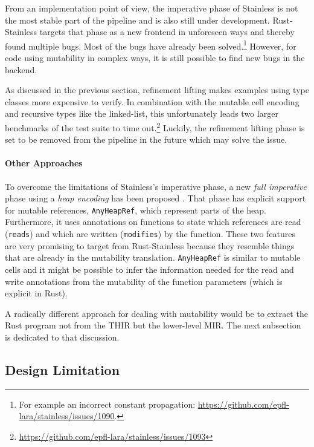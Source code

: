 From an implementation point of view, the imperative phase of Stainless is not
the most stable part of the pipeline and is also still under development.
Rust-Stainless targets that phase as a new frontend in unforeseen ways  and
thereby found multiple bugs. Most of the bugs have already been
solved.\footnote{For example an incorrect constant propagation:
\url{https://github.com/epfl-lara/stainless/issues/1090}.} However, for code
using mutability in complex ways, it is still possible to find new bugs in the
backend.

As discussed in the previous section, refinement lifting makes examples using
type classes more expensive to verify. In combination with the mutable cell
encoding and recursive types like the linked-list, this unfortunately leads two
larger benchmarks of the test suite to time
out.\footnote{\url{https://github.com/epfl-lara/stainless/issues/1093}} Luckily,
the refinement lifting phase is set to be removed from the pipeline in the
future which may solve the issue.

\paragraph{Other Approaches}

To overcome the limitations of Stainless's imperative phase, a new \emph{full
imperative} phase using a \emph{heap encoding} has been proposed
\cite{new-imperative}. That phase has explicit support for mutable references,
\lstinline!AnyHeapRef!, which represent parts of the heap. Furthermore, it uses
annotations on functions to state which references are read (\lstinline!reads!)
and which are written (\lstinline!modifies!) by the function. These two features
are very promising to target from Rust-Stainless because they resemble things
that are already in the mutability translation. \lstinline!AnyHeapRef! is
similar to mutable cells and it might be possible to infer the information
needed for the read and write annotations from the mutability of the function
parameters (which is explicit in Rust).

A radically different approach for dealing with mutability would be to extract
the Rust program not from the THIR but the lower-level MIR. The next
subsection is dedicated to that discussion.

\subsection{Design Limitation}
\label{mir-thir}

